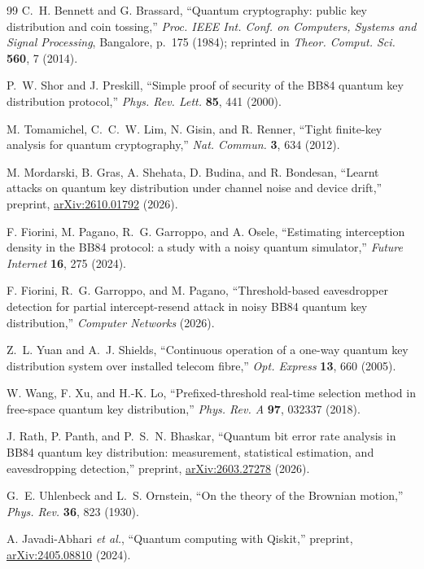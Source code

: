 \documentclass[11pt]{article}
\begin{document}
\begin{thebibliography}{99}
\small
{} C.~H. Bennett and G. Brassard, ``Quantum cryptography: public key distribution and coin tossing,'' \emph{Proc. IEEE Int. Conf. on Computers, Systems and Signal Processing}, Bangalore, p.~175 (1984); reprinted in \emph{Theor. Comput. Sci.} \textbf{560}, 7 (2014).

 P.~W. Shor and J. Preskill, ``Simple proof of security of the BB84 quantum key distribution protocol,'' \emph{Phys. Rev. Lett.} \textbf{85}, 441 (2000).

 M. Tomamichel, C.~C.~W. Lim, N. Gisin, and R. Renner, ``Tight finite-key analysis for quantum cryptography,'' \emph{Nat. Commun.} \textbf{3}, 634 (2012).

 M. Mordarski, B. Gras, A. Shehata, D. Budina, and R. Bondesan, ``Learnt attacks on quantum key distribution under channel noise and device drift,'' preprint, \href{https://arxiv.org/abs/2610.01792}{arXiv:2610.01792} (2026).

 F. Fiorini, M. Pagano, R.~G. Garroppo, and A. Osele, ``Estimating interception density in the BB84 protocol: a study with a noisy quantum simulator,'' \emph{Future Internet} \textbf{16}, 275 (2024).

 F. Fiorini, R.~G. Garroppo, and M. Pagano, ``Threshold-based eavesdropper detection for partial intercept-resend attack in noisy BB84 quantum key distribution,'' \emph{Computer Networks} (2026).

 Z.~L. Yuan and A.~J. Shields, ``Continuous operation of a one-way quantum key distribution system over installed telecom fibre,'' \emph{Opt. Express} \textbf{13}, 660 (2005).

 W. Wang, F. Xu, and H.-K. Lo, ``Prefixed-threshold real-time selection method in free-space quantum key distribution,'' \emph{Phys. Rev. A} \textbf{97}, 032337 (2018).

 J. Rath, P. Panth, and P.~S.~N. Bhaskar, ``Quantum bit error rate analysis in BB84 quantum key distribution: measurement, statistical estimation, and eavesdropping detection,'' preprint, \href{https://arxiv.org/abs/2603.27278}{arXiv:2603.27278} (2026).

 G.~E. Uhlenbeck and L.~S. Ornstein, ``On the theory of the Brownian motion,'' \emph{Phys. Rev.} \textbf{36}, 823 (1930).

 A. Javadi-Abhari \emph{et al.}, ``Quantum computing with Qiskit,'' preprint, \href{https://arxiv.org/abs/2405.08810}{arXiv:2405.08810} (2024).
\end{thebibliography}
\end{document}
